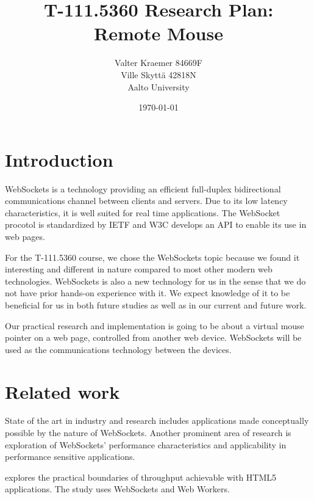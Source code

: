 \documentclass[12pt,a4paper,english,oneside]{article}
\begin{document}
\title{T-111.5360 Research Plan:\\[5mm]
Remote Mouse}

\author{Valter Kraemer 84669F \\
  Ville Skyttä 42818N \\
Aalto University}

\date{\today}

\maketitle


\section{Introduction}

WebSockets is a technology providing an efficient full-duplex
bidirectional communications channel between clients and servers. Due
to its low latency characteristics, it is well suited for real time
applications. The WebSocket procotol is standardized by IETF
\citep{rfc} and W3C \citep{w3c} develops an API to enable its use in
web pages.

For the T-111.5360 course, we chose the WebSockets topic because we
found it interesting and different in nature compared to most other
modern web technologies. WebSockets is also a new technology for us in
the sense that we do not have prior hands-on experience with it. We
expect knowledge of it to be beneficial for us in both future studies
as well as in our current and future work.

Our practical research and implementation is going to be about a
virtual mouse pointer on a web page, controlled from another web
device. WebSockets will be used as the communications technology
between the devices.

\section{Related work}

State of the art in industry and research includes applications made
conceptually possible by the nature of WebSockets. Another prominent
area of research is exploration of WebSockets' performance
characteristics and applicability in performance sensitive
applications.

\citet{throughput} explores the practical boundaries of throughput
achievable with HTML5 applications. The study uses WebSockets and Web
Workers.
\end{document}

